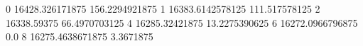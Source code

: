 0 16428.326171875 156.2294921875
1 16383.6142578125 111.517578125
2 16338.59375 66.4970703125
4 16285.32421875 13.2275390625
6 16272.0966796875 0.0
8 16275.4638671875 3.3671875

